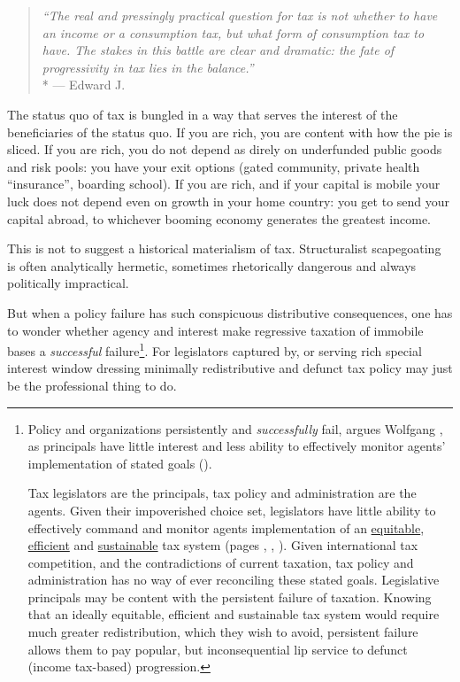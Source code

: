 \begin{quote}
	\emph{``The real and pressingly practical question for tax is not whether to have an income or a consumption tax, but what form of consumption tax to have.
	The stakes in this battle are clear and dramatic:
	the fate of progressivity in tax lies in the balance.''}\\*
	--- Edward J.\ \cite[817]{McCaffery2005}
\end{quote}

The status quo of tax is bungled in a way that serves the interest of the beneficiaries of the status quo.
If you are rich, you are content with how the pie is sliced.
If you are rich, you do not depend as direly on underfunded public goods and risk pools:
you have your exit options (gated community, private health ``insurance'', boarding school).
If you are rich, and if your capital is mobile your luck does not depend even on growth in your home country:
you get to send your capital abroad, to whichever booming economy generates the greatest income.

This is not to suggest a historical materialism of tax.
Structuralist scapegoating is often analytically hermetic, sometimes rhetorically dangerous and always politically impractical.

But when a policy failure has such conspicuous distributive consequences, one has to wonder whether agency and interest make regressive taxation of immobile bases a \emph{successful} failure\footnote{Policy and organizations persistently and \emph{successfully} fail, argues Wolfgang \citeauthor{Seibel-1996-aa}, as principals have little interest and less ability to effectively monitor agents' implementation of stated goals (\citeyear{Seibel-1996-aa}).

Tax legislators are the principals, tax policy and administration are the agents.
Given their impoverished choice set, legislators have little ability to effectively command and monitor agents implementation of an \hyperref[sec:Equity]{equitable}, \hyperref[sec:Efficiency]{efficient} and \hyperref[sec:Sustainability]{sustainable} tax system (pages \pageref{sec:Equity}, \pageref{sec:Efficiency}, \pageref{sec:Sustainability}).
Given international tax competition, and the contradictions of current taxation, tax policy and administration has no way of ever reconciling these stated goals.
Legislative principals may be content with the persistent failure of taxation.
Knowing that an ideally equitable, efficient and sustainable tax system would require much greater redistribution, which they wish to avoid, persistent failure allows them to pay popular, but inconsequential lip service to defunct (income tax-based) progression.}.
For legislators captured by, or serving rich special interest window dressing minimally redistributive and defunct tax policy may just be the professional thing to do.

